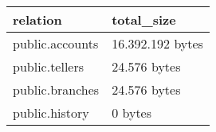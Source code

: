 \begin{tabular}{ll}
\rowcolor{heading}
\color{white}\textbf{relation} &
\color{white}\textbf{total\_size}\\
\hline

public.accounts & 16.392.192 bytes\\
public.tellers &  24.576 bytes\\
public.branches & 24.576 bytes\\
public.history & 0 bytes\\

\hline
\end{tabular}
